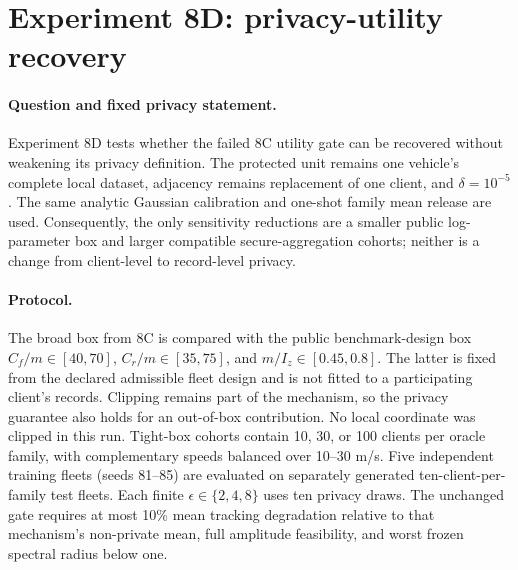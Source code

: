 \section{Experiment 8D: privacy-utility recovery}
\label{sec:experiment8d}

\paragraph{Question and fixed privacy statement.}
Experiment 8D tests whether the failed 8C utility gate can be recovered without
weakening its privacy definition. The protected unit remains one vehicle's
complete local dataset, adjacency remains replacement of one client, and
$\delta=10^{-5}$. The same analytic Gaussian calibration and one-shot family
mean release are used. Consequently, the only sensitivity reductions are a
smaller public log-parameter box and larger compatible secure-aggregation
cohorts; neither is a change from client-level to record-level privacy.

\paragraph{Protocol.}
The broad box from 8C is compared with the public benchmark-design box
$C_f/m\in[40,70]$, $C_r/m\in[35,75]$, and $m/I_z\in[0.45,0.8]$.
The latter is fixed from the declared admissible fleet design and is not fitted
to a participating client's records. Clipping remains part of the mechanism,
so the privacy guarantee also holds for an out-of-box contribution. No local
coordinate was clipped in this run. Tight-box cohorts contain 10, 30, or 100
clients per oracle family, with complementary speeds balanced over 10--30 m/s.
Five independent training fleets (seeds 81--85) are evaluated on separately
generated ten-client-per-family test fleets. Each finite
$\epsilon\in\{2,4,8\}$ uses ten privacy draws. The unchanged gate requires at
most 10\% mean tracking degradation relative to that mechanism's non-private
mean, full amplitude feasibility, and worst frozen spectral radius below one.

